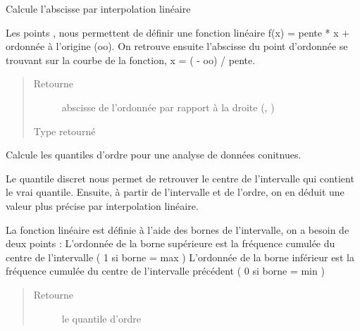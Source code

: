 \documentclass[letterpaper,10pt,french]{sphinxmanual}
\begin{document}

\begin{fulllineitems}
\label{\detokenize{addQuantitativesContinues:add.addQuantitativesContinues.interpolationLineaire}}
Calcule l’abscisse par interpolation linéaire

Les points ,  nous permettent de définir une fonction linéaire f(x) = pente * x + ordonnée à l’origine (oo).
On retrouve ensuite l’abscisse du point d’ordonnée  se trouvant sur la courbe de la fonction, x = ( - oo) / pente.
\begin{quote}\begin{description}
\item[{Retourne}] \leavevmode
abscisse de l’ordonnée  par rapport à la droite (, )

\item[{Type retourné}] \leavevmode
{}

\end{description}\end{quote}

\end{fulllineitems}


\begin{fulllineitems}
\label{\detokenize{addQuantitativesContinues:add.addQuantitativesContinues.quantileContinu}}
Calcule les quantiles d’ordre  pour une analyse de données conitnues.

Le quantile discret nous permet de retrouver le centre de l’intervalle qui contient le vrai quantile.
Ensuite, à partir de l’intervalle et de l’ordre, on en déduit une valeur plus précise par interpolation linéaire.

La fonction linéaire est définie à l’aide des bornes de l’intervalle, on  a besoin de deux points :
L’ordonnée de la borne supérieure est la fréquence cumulée du centre de l’intervalle ( 1 si borne = max )
L’ordonnée de la borne inférieur est la fréquence cumulée du centre de l’intervalle précédent ( 0 si borne = min )
\begin{quote}\begin{description}
\item[{Retourne}] \leavevmode
le quantile d’ordre 

\end{description}\end{quote}

\end{fulllineitems}
\end{document}
